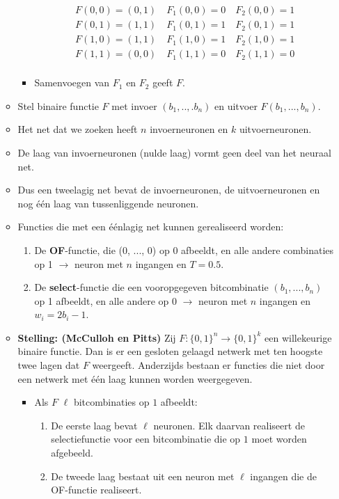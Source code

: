 \begin{itemize}
\begin{itemize}
\begin{itemize}
            \begin{align*}
                F(0, 0) = (0, 1) \quad F_1(0, 0) = 0 \quad F_2(0, 0) = 1 \\
                F(0, 1) = (1, 1) \quad F_1(0, 1) = 1 \quad F_2(0, 1) = 1 \\
                F(1, 0) = (1, 1) \quad F_1(1, 0) = 1 \quad F_2(1, 0) = 1 \\
                F(1, 1) = (0, 0) \quad F_1(1, 1) = 0 \quad F_2(1, 1) = 0 \\
            \end{align*}
            \item Samenvoegen van $F_1$ en $F_2$ geeft $F$.
        \end{itemize}
        \item Stel binaire functie $F$ met invoer $(b_1, ..,. b_n)$ en uitvoer $F(b_1, ..., b_n)$.
        \item Het net dat we zoeken heeft $n$ invoerneuronen en $k$ uitvoerneuronen. 
        \item De laag van invoerneuronen (nulde laag) vormt geen deel van het neuraal net.
        \item Dus een tweelagig net bevat de invoerneuronen, de uitvoerneuronen en nog één laag van tussenliggende neuronen.
        \item Functies die met een éénlagig net kunnen gerealiseerd worden:
        \begin{enumerate}
            \item De \textbf{OF}-functie, die (0, ..., 0) op 0 afbeeldt, en alle andere combinaties op 1 $ \rightarrow$ neuron met $n$ ingangen en $T = 0.5$.
            \item De \textbf{select}-functie die een vooropgegeven bitcombinatie $(b_1, ..., b_n)$ op 1 afbeeldt, en alle andere op 0 $\rightarrow$ neuron met $n$ ingangen en $w_i = 2b_i - 1$.
        \end{enumerate}
        \item \textbf{Stelling: (McCulloh en Pitts)} Zij $F : \{0, 1\}^n \rightarrow \{0, 1\}^k$ een willekeurige binaire functie. Dan is er een gesloten gelaagd netwerk met ten hoogste twee lagen dat $F$ weergeeft. Anderzijds bestaan er functies die niet door een netwerk met één laag kunnen worden weergegeven.
        \begin{itemize}
            \item Als $F$ $\ell$ bitcombinaties op $1$ afbeeldt:
            \begin{enumerate}
                \item De eerste laag bevat $\ell$ neuronen. Elk daarvan realiseert de selectiefunctie voor een bitcombinatie die op $1$ moet worden afgebeeld.
                \item De tweede laag bestaat uit een neuron met $\ell$ ingangen die de OF-functie realiseert.
            \end{enumerate}
        \end{itemize}
    \end{itemize}
\end{itemize}


